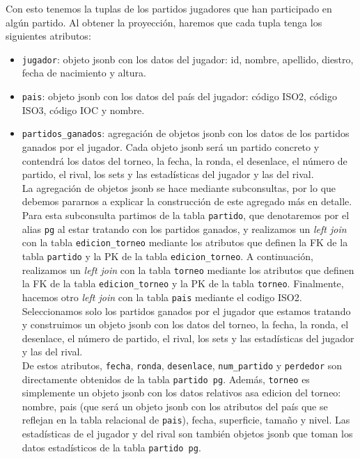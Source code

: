 Con esto tenemos la tuplas de los partidos jugadores que han participado en algún partido. Al obtener la proyección, haremos que cada tupla tenga los siguientes atributos: 
\begin{itemize}
\item \texttt{jugador}: objeto jsonb con los datos del jugador: id, nombre, apellido, diestro, fecha de nacimiento y altura.
\item \texttt{pais}: objeto jsonb con los datos del país del jugador: código ISO2, código ISO3, código IOC y nombre.
\item \texttt{partidos\_ganados}: agregación de objetos jsonb con los datos de los partidos ganados por el jugador. Cada objeto jsonb será un partido concreto y contendrá los datos del torneo, la fecha, la ronda, el desenlace, el número de partido, el rival, los sets y las estadísticas del jugador y las del rival. \\

La agregación de objetos jsonb se hace mediante subconsultas, por lo que debemos pararnos a explicar la construcción de este agregado más en detalle. Para esta subconsulta partimos de la tabla \texttt{partido}, que denotaremos por el alias \texttt{pg} al estar tratando con los partidos ganados, y realizamos un \textit{left join} con la tabla \texttt{edicion\_torneo} mediante los atributos que definen la FK de la tabla \texttt{partido} y la PK de la tabla \texttt{edicion\_torneo}. A continuación, realizamos un \textit{left join} con la tabla \texttt{torneo} mediante los atributos que definen la FK de la tabla \texttt{edicion\_torneo} y la PK de la tabla \texttt{torneo}. Finalmente, hacemos otro \textit{left join} con la tabla \texttt{pais} mediante el codigo ISO2. Seleccionamos solo los partidos ganados por el jugador que estamos tratando y construimos un objeto jsonb con los datos del torneo, la fecha, la ronda, el desenlace, el número de partido, el rival, los sets y las estadísticas del jugador y las del rival. \\

De estos atributos, \texttt{fecha}, \texttt{ronda}, \texttt{desenlace}, \texttt{num\_partido} y \texttt{perdedor} son directamente obtenidos de la tabla \texttt{partido pg}. Además, \texttt{torneo} es simplemente un objeto jsonb con los datos relativos asa edicion del torneo: nombre, pais (que será un objeto jsonb con los atributos del país que se reflejan en la tabla relacional de \texttt{pais}), fecha, superficie, tamaño y nivel. Las estadísticas de el jugador y del rival son también objetos jsonb que toman los datos estadísticos de la tabla \texttt{partido pg}. \\


\end{itemize}
